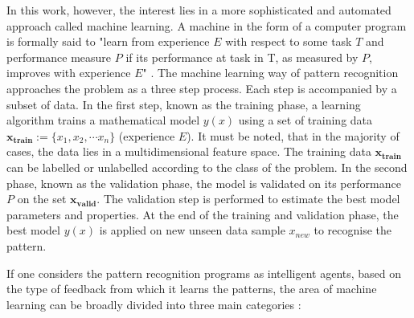 In this work, however, the interest lies in a more sophisticated and automated approach called machine learning. A machine in the form of a computer program is formally said to "learn from experience $E$ with respect to some task $T$ and performance measure $P$ if its performance at task in T, as measured by $P$, improves with experience $E$" \citep{mitchell1997machine}. The machine learning way of pattern recognition approaches the problem as a three step process. Each step is accompanied by a subset of data. In the first step, known as the training phase, a learning algorithm trains a mathematical model $y(x)$ using a set of training data $\mathbf{x_{train}}:=\lbrace x_1,x_2,\cdots x_n\rbrace$ (experience $E$). It must be noted, that in the majority of cases, the data lies in a multidimensional feature space. The training data $\mathbf{x_{train}}$ can be labelled or unlabelled according to the class of the problem. In the second phase, known as the validation phase, the model is validated on its performance $P$ on the 
 set $\mathbf{x_{valid}}$. The validation step is performed to estimate the best model parameters and properties. At the end of the training and validation phase, the best model $y(x)$ is applied on new unseen data sample $x_{new}$ to recognise the pattern.

If one considers the pattern recognition programs as intelligent agents, based on the type of feedback from which it learns the patterns, the area of machine learning can be broadly divided into three main categories \citep{russell2003norvig}:


